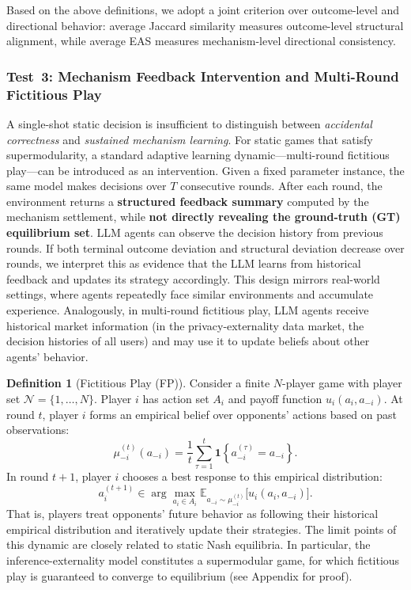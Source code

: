 \documentclass[sigconf,anonymous,review]{acmart}
\theoremstyle{definition}
\newtheorem{definition}{Definition}
\begin{document}
Based on the above definitions, we adopt a joint criterion over outcome-level and directional behavior: average Jaccard similarity measures outcome-level structural alignment, while average EAS measures mechanism-level directional consistency.

\subsubsection{\textbf{Test~3: Mechanism Feedback Intervention and Multi-Round Fictitious Play}}
\label{subsubsec:rq3}

A single-shot static decision is insufficient to distinguish between \emph{accidental correctness} and \emph{sustained mechanism learning}.
For static games that satisfy supermodularity, a standard adaptive learning dynamic—multi-round fictitious play—can be introduced as an intervention.
Given a fixed parameter instance, the same model makes decisions over $T$ consecutive rounds.
After each round, the environment returns a \textbf{structured feedback summary} computed by the mechanism settlement, while \textbf{not directly revealing the ground-truth (GT) equilibrium set}.
LLM agents can observe the decision history from previous rounds.
If both terminal outcome deviation and structural deviation decrease over rounds, we interpret this as evidence that the LLM learns from historical feedback and updates its strategy accordingly.
This design mirrors real-world settings, where agents repeatedly face similar environments and accumulate experience.
Analogously, in multi-round fictitious play, LLM agents receive historical market information (in the privacy-externality data market, the decision histories of all users) and may use it to update beliefs about other agents’ behavior.

\begin{definition}[Fictitious Play (FP)]
Consider a finite $N$-player game with player set $\mathcal{N}=\{1,\dots,N\}$.
Player $i$ has action set $A_i$ and payoff function $u_i(a_i,a_{-i})$.
At round $t$, player $i$ forms an empirical belief over opponents’ actions based on past observations:
\begin{equation}
    \mu_{-i}^{(t)}(a_{-i})
    =
    \frac{1}{t}\sum_{\tau=1}^{t}\mathbf{1}\!\left\{a_{-i}^{(\tau)}=a_{-i}\right\}.
\end{equation}
In round $t\!+\!1$, player $i$ chooses a best response to this empirical distribution:
\begin{equation}
    a_i^{(t+1)}
    \in
    \arg\max_{a_i\in A_i}
    \mathbb{E}_{a_{-i}\sim \mu_{-i}^{(t)}}\!\big[u_i(a_i,a_{-i})\big].
\end{equation}
That is, players treat opponents’ future behavior as following their historical empirical distribution and iteratively update their strategies.
The limit points of this dynamic are closely related to static Nash equilibria.
In particular, the inference-externality model constitutes a supermodular game, for which fictitious play is guaranteed to converge to equilibrium (see Appendix for proof).
\end{definition}
\end{document}
